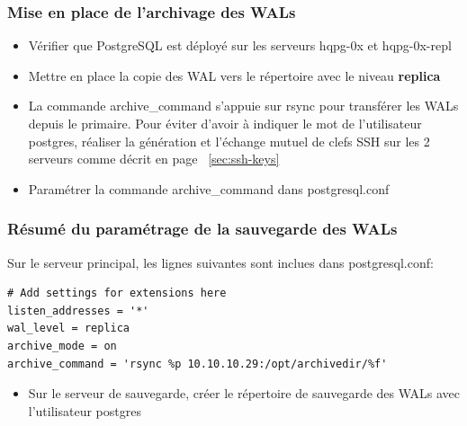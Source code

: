 \begin{frame}[fragile]\frametitle{Mise en place de l'archivage des WALs}

\begin{itemize}
   \item Vérifier que PostgreSQL est déployé sur les serveurs \textsf{hqpg-0x} et \textsf{hqpg-0x-repl}
   \item Mettre en place la copie des WAL vers le répertoire  avec le niveau \textbf{replica}
   \item La commande \textsf{archive\_command} s'appuie sur rsync pour transférer les WALs depuis le primaire. Pour éviter d'avoir à indiquer le mot de l'utilisateur postgres, réaliser la génération et l'échange mutuel de clefs SSH sur les 2 serveurs comme décrit en page ~\ref{sec:ssh-keys}
   \item Paramétrer la commande \textsf{archive\_command} dans postgresql.conf

\end{itemize}

\end{frame}


\begin{frame}[fragile]\frametitle{Résumé du paramétrage de la sauvegarde des WALs}

Sur le serveur principal, les lignes suivantes sont inclues dans postgresql.conf:
\begin{tiny}
\begin{verbatim}
# Add settings for extensions here
listen_addresses = '*'
wal_level = replica
archive_mode = on
archive_command = 'rsync %p 10.10.10.29:/opt/archivedir/%f'
\end{verbatim}
\end{tiny}

\begin{itemize}
   \item Sur le serveur de sauvegarde, créer le répertoire  de sauvegarde des WALs avec l'utilisateur postgres
\end{itemize}

\end{frame}

